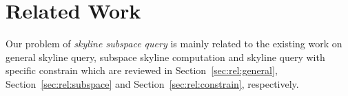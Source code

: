 
%
%

\chapter{Related Work}
\label {ch:related-work}

Our problem of \emph{skyline subspace query} is mainly related to the existing work on general skyline query, subspace skyline computation and skyline query with specific constrain which are reviewed in Section~\ref{sec:rel:general}, Section~\ref{sec:rel:subspace} and Section~\ref{sec:rel:constrain}, respectively.

